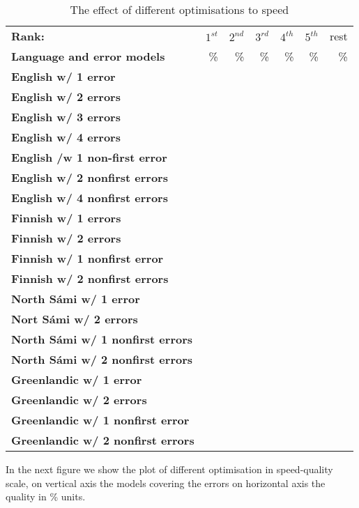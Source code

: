 \documentclass[a4paper,12pt]{article}
\begin{document}
\begin{table}
    \centering
    \begin{tabular}{|l|r|r|r|r|r|r|}
        \hline
        \bf Rank: & $1^{st}$ & $2^{nd}$ & $3^{rd}$ & $4^{th}$ & $5^{th}$ & rest \\
        \bf Language and error models &  \% & \% & \% & \% & \% & \% \\
        \hline
        \bf English w/ 1 error & & & & & & \\
     \bf English w/ 2 errors & & & & & & \\
   \bf English w/ 3 errors & & & & & & \\
          \bf English w/ 4 errors & & & & & & \\
 \bf English /w 1 non-first error & & & & & & \\
 \bf English w/ 2 nonfirst errors & & & & & & \\
 \bf English w/ 4 nonfirst errors & & & & & & \\
        \hline
        \bf Finnish w/ 1 errors & & & & & & \\
        \bf Finnish w/ 2 errors & & & & & & \\
\bf Finnish w/ 1 nonfirst error & & & & & & \\
        \bf Finnish w/ 2 nonfirst errors & & & & & & \\
        \hline
        \bf North Sámi w/ 1 error & & & & & & \\
        \bf Nort Sámi w/ 2 errors & & & & & & \\
        \bf North Sámi w/ 1 nonfirst errors & & & & & & \\
        \bf North Sámi w/ 2 nonfirst errors & & & & & & \\
        \hline
        \bf Greenlandic w/ 1 error & & & & & & \\
       \bf Greenlandic w/ 2 errors & & & & & & \\
        \bf Greenlandic w/ 1 nonfirst error & & & & & & \\
       \bf Greenlandic w/ 2 nonfirst errors & & & & & & \\
        \hline
    \end{tabular}
    \caption{The effect of different optimisations to speed
    \label{table:optimisation-speed}}
\end{table}

In the next figure we show the plot of different optimisation in speed-quality
scale, on vertical axis the models covering the errors on horizontal axis the
quality in \% units.
\end{document}
